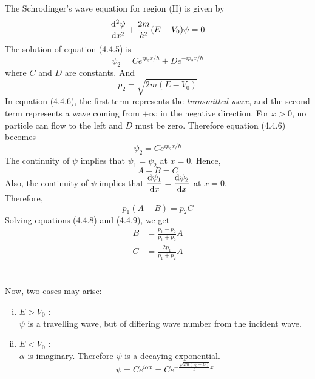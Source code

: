 \documentclass[12pt]{article}
\numberwithin{equation}{subsection}
\begin{document}
The Schrodinger's wave equation for region (II) is given by
\begin{equation}
    \dv[2]{\psi}{x} + \frac{2m}{\hbar^2} (E-V_0)\psi = 0
\end{equation}
The solution of equation (4.4.5) is
\begin{equation}
    \psi_2 = C e^{ip_2x/\hbar} + D e^{-ip_2x/\hbar}
\end{equation}
where $C$ and $D$ are constants. And \[
    p_2 = \sqrt{2m(E-V_0)}
\]
In equation (4.4.6), the first term represents the \textit{transmitted wave}, and the second term represents a wave coming from $+\infty$ in the negative direction. For $x>0$, no particle can flow to the left and $D$ must be zero. Therefore equation (4.4.6) becomes
\begin{equation}
    \psi_2 = C e^{ip_2x/\hbar}
\end{equation}
The continuity of $\psi$ implies that $\psi_1=\psi_2$ at $x=0$. Hence,
\begin{equation}
    A + B = C
\end{equation}
Also, the continuity of $\psi$ implies that $\displaystyle \dv{\psi_1}{x} = \dv{\psi_2}{x}$ at $x=0$.\\
Therefore,
\begin{equation}
    p_1(A-B) = p_2C
\end{equation}
Solving equations (4.4.8) and (4.4.9), we get
\begin{align}
    B &= \frac{p_1-p_2}{p_1+p_2} A \\
    C &= \frac{2p_1}{p_1+p_2} A
\end{align} \\~\\

Now, two cases may arise:
\begin{enumerate}[(i)]
    \item $E > V_0$ :\\
        $\psi$ is a travelling wave, but of differing wave number from the incident wave.
    \item $E < V_0$ :\\
        $\alpha$ is imaginary. Therefore $\psi$ is a decaying exponential. \[
            \psi = Ce^{i\alpha x} = Ce^{-\frac{\sqrt{2m(V_0-E)}}{\hbar}x}
        \]
\end{enumerate}
\end{document}
